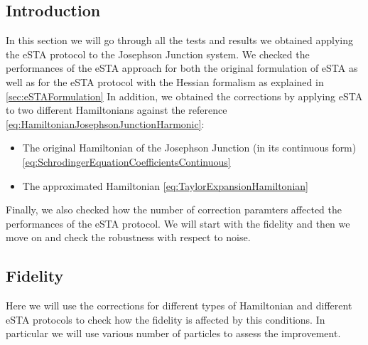 \documentclass{article}
\begin{document}
\subsection{Introduction}
In this section we will go through all the tests and results we obtained applying the eSTA protocol to the Josephson Junction system.
We checked the performances of the eSTA approach for both the original formulation of eSTA as well as for the eSTA protocol with the Hessian formalism as explained in \cref{sec:eSTAFormulation}
In addition, we obtained the corrections by applying eSTA to two different Hamiltonians against the reference \cref{eq:HamiltonianJosephsonJunctionHarmonic}:
\begin{itemize}
	\item The original Hamiltonian of the Josephson Junction (in its continuous form) \cref{eq:SchrodingerEquationCoefficientsContinuous}
	\item The approximated Hamiltonian \cref{eq:TaylorExpansionHamiltonian}
\end{itemize}
Finally, we also checked how the number of correction paramters affected the performances of the eSTA protocol.
We will start with the fidelity and then we move on and check the robustness with respect to noise.

\subsection{Fidelity}
Here we will use the corrections for different types of Hamiltonian and different eSTA protocols to check how the fidelity is affected by this conditions.
In particular we will use various number of particles to assess the improvement.
\end{document}
